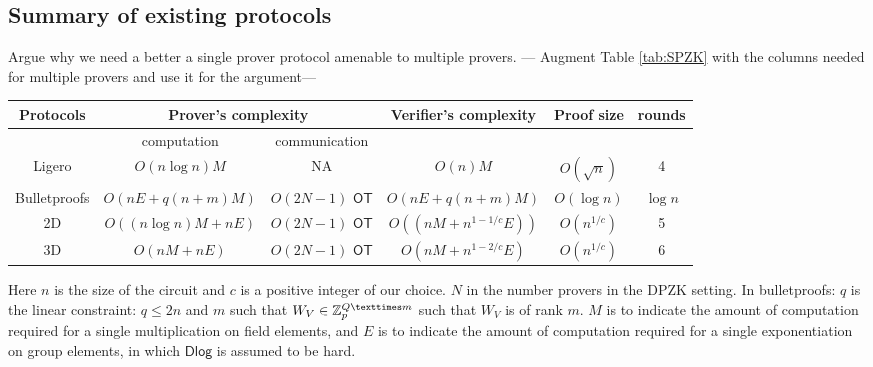 \subsection{Summary of existing protocols}
Argue why we need a better a single prover protocol amenable to multiple provers. 
--- Augment Table \ref{tab:SPZK} with the columns needed for multiple provers and use it for the argument--- 
\begin{center}
	\begin{tabular}{ |c|c|c|c|c|c| } 
		\hline
		Protocols & \multicolumn{2}{c|}{Prover's complexity} & Verifier's complexity & Proof size & rounds \\
		\hline
		&computation & communication& & & \\ 
		\hline
		Ligero & $O(n\log n)M$ & NA &$O(n)M$ & $O(\sqrt{n})$ & 4\\
		\hline
		Bulletproofs & $O(nE+q(n+m)M)$ & $O(2N-1)$ $\mathsf{OT}$& $O(nE+q(n+m)M)$ & $O(\log n)$ & $\log n$  \\
		\hline
		\name2D & $O((n \log ⁡n)M +nE)$& $
		
		O(2N-1)$ $\mathsf{OT}$ & $O((n M+n^{1-1/c}E) )$& $O(n^{1/c})$ & 5 \\
		\hline
		\name3D & $O(nM+nE)$ & $O(2N-1)$ $\mathsf{OT}$ & $O(nM+n^{1-2/c}E)$& $O(n^{1/c})$ & $6$\\
		\hline
	\end{tabular}
\end{center}
Here $n$ is the size of the circuit and $c$ is a positive integer of our choice. $N$ in the number provers in the DPZK setting. 
In bulletproofs: $q$ is the linear constraint: $q\leq 2n$ and $m$ such that $W_V \in \bbZ_p^{Q×m}$  such that $W_V$ is of rank $m$.
$M$ is to indicate the amount of computation required for a single multiplication on field elements, and $E$ is to indicate the amount of computation required for a single exponentiation on group elements, in which $\mathsf{Dlog}$ is assumed to be hard.

